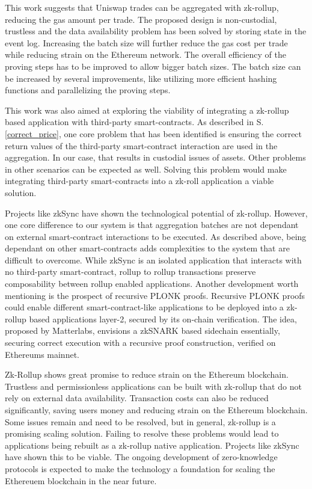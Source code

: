 \documentclass[../../thesis.tex]{subfiles}
\begin{document}
This work suggests that Uniswap trades can be aggregated with zk-rollup, reducing the gas amount per trade. The proposed design is non-custodial, trustless and the data availability problem has been solved by storing state in the event log. Increasing the batch size will further reduce the gas cost per trade while reducing strain on the Ethereum network. The overall efficiency of the proving steps has to be improved to allow bigger batch sizes. The batch size can be increased by several improvements, like utilizing more efficient hashing functions and parallelizing the proving steps. 

This work was also aimed at exploring the viability of integrating a zk-rollup based application with third-party smart-contracts. As described in S. \ref{correct_price}, one core problem that has been identified is ensuring the correct return values of the third-party smart-contract interaction are used in the aggregation. In our case, that results in custodial issues of assets. Other problems in other scenarios can be expected as well. Solving this problem would make integrating third-party smart-contracts into a zk-roll application a viable solution.

Projects like zkSync have shown the technological potential of zk-rollup. However, one core difference to our system is that aggregation batches are not dependant on external smart-contract interactions to be executed. As described above, being dependant on other smart-contracts adds complexities to the system that are difficult to overcome. While zkSync is an isolated application that interacts with no third-party smart-contract, rollup to rollup transactions preserve composability between rollup enabled applications. Another development worth mentioning is the prospect of recursive PLONK proofs. Recursive PLONK proofs could enable different smart-contract-like applications to be deployed into a zk-rollup based applications layer-2, secured by its on-chain verification. The idea, proposed by Matterlabs, envisions a zkSNARK based sidechain essentially, securing correct execution with a recursive proof construction, verified on Ethereums mainnet. 

Zk-Rollup shows great promise to reduce strain on the Ethereum blockchain. Trustless and permissionless applications can be built with zk-rollup that do not rely on external data availability. Transaction costs can also be reduced significantly, saving users money and reducing strain on the Ethereum blockchain. Some issues remain and need to be resolved, but in general, zk-rollup is a promising scaling solution. Failing to resolve these problems would lead to applications being rebuilt as a zk-rollup native application. Projects like zkSync have shown this to be viable. The ongoing development of zero-knowledge protocols is expected to make the technology a foundation for scaling the Ethereuem blockchain in the near future.
\end{document}

